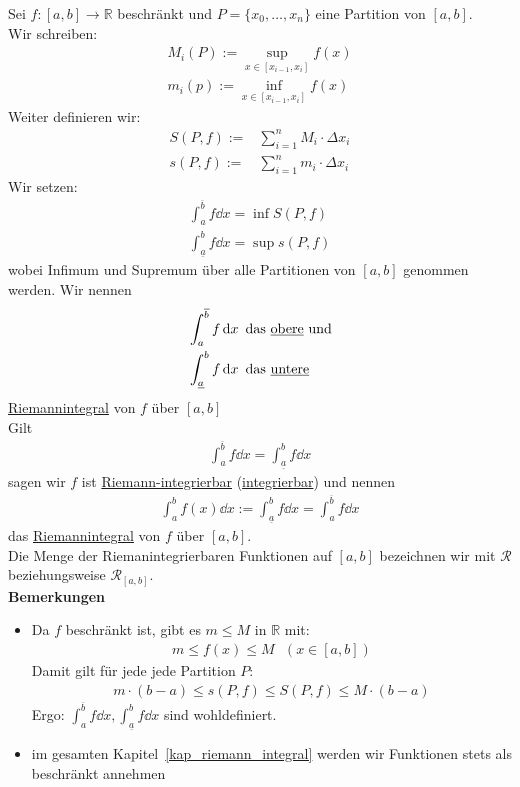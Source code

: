 \begin{Definition}{ \label{def_riemann-integrierbar}
	Sei $f : [a,b] \rightarrow \mathbb{R}$ beschränkt und $P = \{x_0, \hdots, x_n\}$ 
	eine Partition von $[a,b]$.\\
	Wir schreiben: 
	\begin{align*}
		M_i(P) := \sup_{x \in [x_{i-1}, x_i]} f(x) \\
		m_i(p) := \inf_{x \in [x_{i-1}, x_i]} f(x)
	\end{align*}
	Weiter definieren wir: 
	\begin{align*}
		S(P,f) := & \sum_{i=1}^n M_i \cdot \Delta x_i \\
		s(P,f) := & \sum_{i=1}^n m_i \cdot \Delta x_i
	\end{align*}
	Wir setzen:
	\begin{align*}
		\int_a^{\overline{b}} f \dd{x} = \inf S(P,f) \\
		\int_{\underline{a}}^b f \dd{x} = \sup s(P,f)
	\end{align*}
	wobei Infimum und Supremum über alle Partitionen von $[a,b]$ genommen werden. 
	Wir nennen 
	\begin{align*}
		& \int_a^{\overline{b}} f \dd{x} \text{ das \underline{obere} und} \\
		& \int_{\underline{a}}^b f \dd{x} \text{ das \underline{untere}}
	\end{align*}
	\underline{Riemannintegral} von $f$ über $[a,b]$ \\
	Gilt 
	\begin{align*}
		\int_a^{\overline{b}} f \dd{x} = \int_{\underline{a}}^b f \dd{x}
	\end{align*}
	sagen wir $f$ ist \underline{Riemann-integrierbar} (\underline{integrierbar}) 
	und nennen 
	\begin{align*}
		\int_a^b f(x) \dd{x} := \int_{\underline{a}}^b f \dd{x} = 
		\int_a^{\overline{b}} f \dd{x}
	\end{align*}
	das \underline{Riemannintegral} von $f$ über $[a,b]$.\\
	Die Menge der Riemanintegrierbaren Funktionen auf $[a,b]$ bezeichnen wir 
	mit $\mathcal{R}$ beziehungsweise $\mathcal{R}_{[a,b]}$.\\
	\textbf{Bemerkungen}
	\begin{itemize}
		\item Da $f$ beschränkt ist, gibt es $m \leq M$ in $\mathbb{R}$ mit:
		\begin{align*}
			m \leq f(x) \leq M \text{ }(x \in [a,b])
		\end{align*}
		Damit gilt für jede jede Partition $P$: 
		\begin{align*}
			m \cdot (b-a) \leq s(P,f) \leq S(P,f) \leq M \cdot (b-a)
		\end{align*}
		Ergo: $\int_a^{\overline{b}} f \dd{x} , \int_{\underline{a}}^b f \dd{x}$ 
		sind wohldefiniert.
		\item im gesamten Kapitel~\ref{kap_riemann_integral}
		werden wir Funktionen stets als 
		beschränkt annehmen
	\end{itemize}
	
}\end{Definition}

